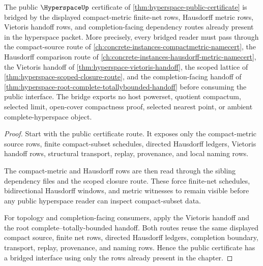 \begin{theorem}
\label{thm:hyperspace-bridged-interface-route}
The public $\HyperspaceUp$ certificate of \autoref{thm:hyperspace-public-certificate} is bridged by the displayed compact-metric finite-net rows, Hausdorff metric rows, Vietoris handoff rows, and completion-facing dependency routes already present in the hyperspace packet. More precisely, every bridged reader must pass through the compact-source route of \autoref{ch:concrete-instances-compactmetric-namecert}, the Hausdorff comparison route of \autoref{ch:concrete-instances-hausdorff-metric-namecert}, the Vietoris handoff of \autoref{thm:hyperspace-vietoris-handoff}, the scoped lattice of \autoref{thm:hyperspace-scoped-closure-route}, and the completion-facing handoff of \autoref{thm:hyperspace-root-complete-totallybounded-handoff} before consuming the public interface. The bridge exports no host powerset, quotient compactum, selected limit, open-cover compactness proof, selected nearest point, or ambient complete-hyperspace object.
\end{theorem}
\begin{proof}
Start with the public certificate route. It exposes only the compact-metric source rows, finite compact-subset schedules, directed Hausdorff ledgers, Vietoris handoff rows, structural transport, replay, provenance, and local naming rows.

The compact-metric and Hausdorff rows are then read through the sibling dependency files and the scoped closure route. These force finite-net schedules, bidirectional Hausdorff windows, and metric witnesses to remain visible before any public hyperspace reader can inspect compact-subset data.

For topology and completion-facing consumers, apply the Vietoris handoff and the root complete--totally-bounded handoff. Both routes reuse the same displayed compact source, finite net rows, directed Hausdorff ledgers, completion boundary, transport, replay, provenance, and naming rows. Hence the public certificate has a bridged interface using only the rows already present in the chapter.
\end{proof}

